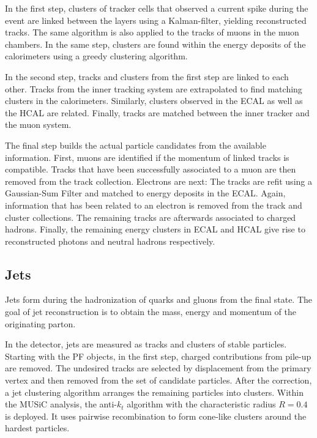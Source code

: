 In the first step, clusters of tracker cells that observed a current spike during the event are linked between the layers using a Kalman-filter, yielding reconstructed tracks. The same algorithm is also applied to the tracks of muons in the muon chambers. In the same step, clusters are found within the energy deposits of the calorimeters using a greedy clustering algorithm.

In the second step, tracks and clusters from the first step are linked to each other. Tracks from the inner tracking system are extrapolated to find matching clusters in the calorimeters. 
Similarly, clusters observed in the \ac{ECAL} as well as the \ac{HCAL} are related. Finally, tracks are matched between the inner tracker and the muon system.

The final step builds the actual particle candidates from the available information.
First, muons are identified if the momentum of linked tracks is compatible. Tracks that have been successfully associated to a muon are then removed from the track collection. Electrons are next: The tracks are refit using a Gaussian-Sum Filter and matched to energy deposits in the \ac{ECAL}. Again, information that has been related to an electron is removed from the track and cluster collections. The remaining tracks are afterwards associated to charged hadrons. Finally, the remaining energy clusters in \ac{ECAL} and \ac{HCAL} give rise to reconstructed photons and neutral hadrons respectively.

\subsection{Jets}
\label{sec:jets}

Jets form during the hadronization of quarks and gluons from the final state. The goal of jet reconstruction is to obtain the mass, energy and momentum of the originating parton. 

In the detector, jets are measured as tracks and clusters of stable particles. Starting with the \ac{PF} objects, in the first step, charged contributions from pile-up are removed. The undesired tracks are selected by displacement from the primary vertex and then removed from the set of candidate particles.
After the correction, a jet clustering algorithm arranges the remaining particles into clusters. Within the \ac{MUSiC} analysis, the anti-$k_t$ algorithm\cite{Cacciari:antiktjet} with the characteristic radius $R = \num{0.4}$ is deployed. It uses pairwise recombination to form cone-like clusters around the hardest particles.

